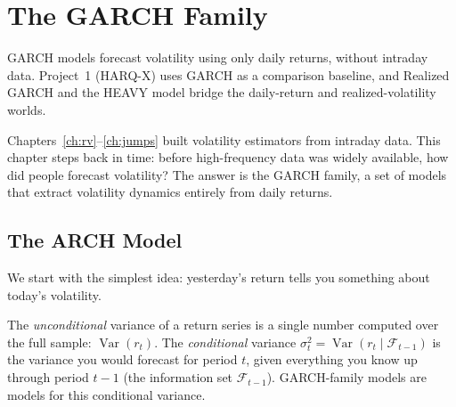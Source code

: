 \chapter{The GARCH Family}
\label{ch:garch}

\begin{application}
GARCH models forecast volatility using only daily returns, without intraday data.
Project~1 (HARQ-X) uses GARCH as a comparison baseline, and Realized GARCH and the
HEAVY model bridge the daily-return and realized-volatility worlds.
\end{application}

Chapters~\ref{ch:rv}--\ref{ch:jumps} built volatility estimators from intraday
data. This chapter steps back in time: before high-frequency data was widely
available, how did people forecast volatility? The answer is the GARCH family, a set
of models that extract volatility dynamics entirely from daily returns.


\section{The ARCH Model}
\label{sec:arch}

We start with the simplest idea: yesterday's return tells you something about
today's volatility.

\begin{prereq}
The \emph{unconditional} variance of a return series is a single number computed
over the full sample: $\operatorname{Var}(r_t)$. The \emph{conditional} variance
$\sigma^2_t = \operatorname{Var}(r_t \mid \mathcal{F}_{t-1})$ is the variance you
would forecast for period $t$, given everything you know up through period $t-1$
(the information set $\mathcal{F}_{t-1}$). GARCH-family models are models for this
conditional variance.
\end{prereq}

